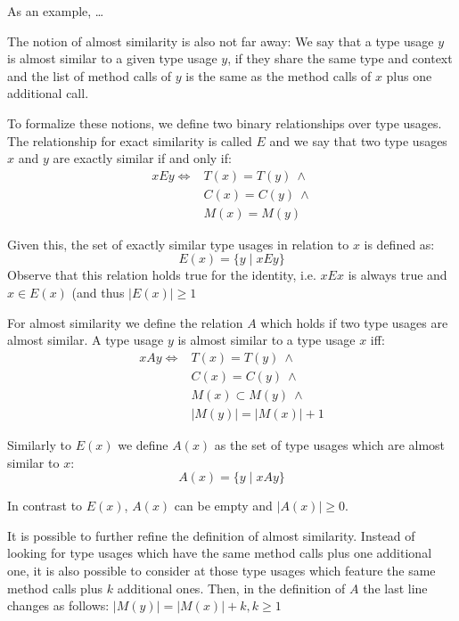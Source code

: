 As an example, \ldots
{}

The notion of almost similarity is also not far away: We say that a type usage $y$ is almost similar to a given type usage $y$, if they share the same type and context and the list of method calls of $y$ is the same as the method calls of $x$ plus one additional call.

To formalize these notions, we define two binary relationships over type usages.
The relationship for exact similarity is called $E$ and we say that two type usages $x$ and $y$ are exactly similar if and only if:
\begin{align*}
xEy \iff & T(x) = T(y) \: \land \\
         & C(x) = C(y) \: \land \\
         & M(x) = M(y)
\end{align*}

Given this, the set of exactly similar type usages in relation to $x$ is defined as:
\begin{equation*}
E(x) = \{y \mid xEy \}
\end{equation*}
Observe that this relation holds true for the identity, i.e. $xEx$ is always true and $x \in E(x)$ (and thus $|E(x)| \geq 1$

For almost similarity we define the relation $A$ which holds if two type usages are almost similar.
A type usage $y$ is almost similar to a type usage $x$ iff:
\begin{align*}
xAy \iff & T(x) = T(y) \: \land \\
         & C(x) = C(y) \: \land \\
         & M(x) \subset M(y) \: \land \\
         & |M(y)| = |M(x)| + 1
\end{align*}

Similarly to $E(x)$ we define $A(x)$ as the set of type usages which are almost similar to $x$:
\begin{equation*}
A(x) = \{y \mid xAy \}
\end{equation*}

In contrast to $E(x)$, $A(x)$ can be empty and $|A(x)|\geq0$.

It is possible to further refine the definition of almost similarity.
Instead of looking for type usages which have the same method calls plus one additional one, it is also possible to consider at those type usages which feature the same method calls plus $k$ additional ones.
Then, in the definition of $A$ the last line changes as follows: $|M(y)| = |M(x)| + k, k\geq1$

